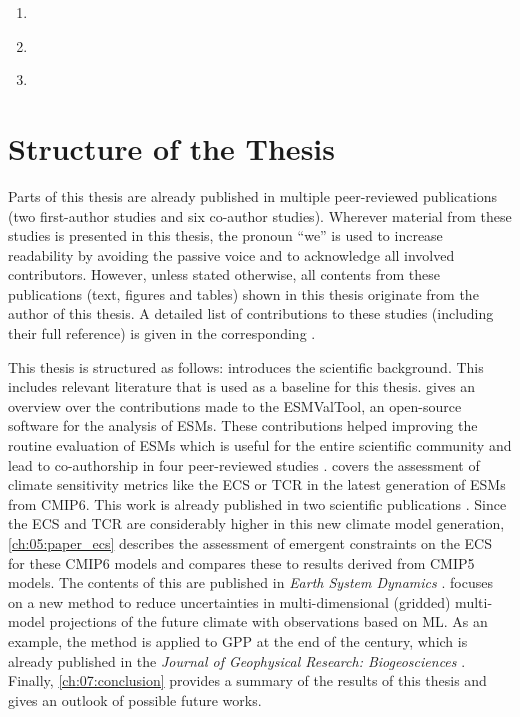 \begingroup
{}
\begin{enumerate}
  \item \label{enum:01:question_1} \KeyScienceQuestionOne{}
  \item \label{enum:01:question_2} \KeyScienceQuestionTwo{}
  \item \label{enum:01:question_3} \KeyScienceQuestionThree{}
\end{enumerate}
\endgroup


\section{Structure of the Thesis}
\label{sec:01:structure}

Parts of this thesis are already published in multiple peer-reviewed
publications (two first-author studies and six co-author studies). Wherever
material from these studies is presented in this thesis, the pronoun
\enquote{we} is used to increase readability by avoiding the passive voice and
to acknowledge all involved contributors. However, unless stated otherwise, all
contents from these publications (text, figures and tables) shown in this
thesis originate from the author of this thesis. A detailed list of
contributions to these studies (including their full reference) is given in the
corresponding .

This thesis is structured as follows: 
introduces the scientific background. This includes relevant literature that is
used as a baseline for this thesis.  gives an overview
over the contributions made to the \ac{ESMValTool}, an open-source software for
the analysis of \acp{ESM}. These contributions helped improving the routine
evaluation of \acp{ESM} which is useful for the entire scientific community and
lead to co-authorship in four peer-reviewed studies \autocite{Eyring2020,
  Lauer2020, Righi2020, Weigel2020}. 
covers the assessment of climate sensitivity metrics like the \ac{ECS} or
\ac{TCR} in the latest generation of \acp{ESM} from \acs{CMIP}6. This work is
already published in two scientific publications \autocite{Bock2020,
  Meehl2020}. Since the \ac{ECS} and \ac{TCR} are considerably higher in this
new climate model generation, \cref{ch:05:paper_ecs} describes the assessment
of emergent constraints on the \ac{ECS} for these \acs{CMIP}6 models and
compares these to results derived from \acs{CMIP}5 models. The contents of this
 are published in \emph{Earth System Dynamics}
\autocite{Schlund2020a}.  focuses on a new method to
reduce uncertainties in multi-dimensional (gridded) multi-model projections of
the future climate with observations based on \ac{ML}. As an example, the
method is applied to \ac{GPP} at the end of the  century, which is
already published in the \emph{Journal of Geophysical Research: Biogeosciences}
\autocite{Schlund2020}. Finally, \cref{ch:07:conclusion} provides a summary of
the results of this thesis and gives an outlook of possible future works.
